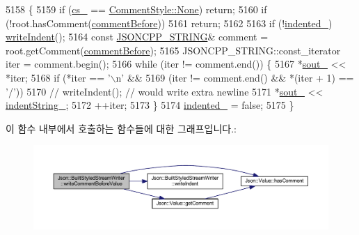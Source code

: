 \begin{DoxyCode}
5158                                                                        \{
5159   \textcolor{keywordflow}{if} (\hyperlink{struct_json_1_1_built_styled_stream_writer_a89a9c76c7531143b52785861ba21c1d4}{cs\_} == \hyperlink{struct_json_1_1_comment_style_a51fc08f3518fd81eba12f340d19a3d0cac8b32a8bae63414c8647d4919da8d437}{CommentStyle::None}) \textcolor{keywordflow}{return};
5160   \textcolor{keywordflow}{if} (!root.hasComment(\hyperlink{namespace_json_a4fc417c23905b2ae9e2c47d197a45351a52f1733775460517b2ea6bedf4906d52}{commentBefore}))
5161     \textcolor{keywordflow}{return};
5162 
5163   \textcolor{keywordflow}{if} (!\hyperlink{struct_json_1_1_built_styled_stream_writer_a6aa0ad023e623f600103631a6bca6d10}{indented\_}) \hyperlink{struct_json_1_1_built_styled_stream_writer_a2b38a3714d415c4bd3b4812897130f3d}{writeIndent}();
5164   \textcolor{keyword}{const} \hyperlink{json-forwards_8h_a1e723f95759de062585bc4a8fd3fa4be}{JSONCPP\_STRING}& comment = root.getComment(\hyperlink{namespace_json_a4fc417c23905b2ae9e2c47d197a45351a52f1733775460517b2ea6bedf4906d52}{commentBefore});
5165   JSONCPP\_STRING::const\_iterator iter = comment.begin();
5166   \textcolor{keywordflow}{while} (iter != comment.end()) \{
5167     *\hyperlink{class_json_1_1_stream_writer_a4f5603d4228a9fa46a42cb44e5234d9b}{sout\_} << *iter;
5168     \textcolor{keywordflow}{if} (*iter == \textcolor{charliteral}{'\(\backslash\)n'} &&
5169        (iter != comment.end() && *(iter + 1) == \textcolor{charliteral}{'/'}))
5170       \textcolor{comment}{// writeIndent();  // would write extra newline}
5171       *\hyperlink{class_json_1_1_stream_writer_a4f5603d4228a9fa46a42cb44e5234d9b}{sout\_} << \hyperlink{struct_json_1_1_built_styled_stream_writer_a0f8115a4fb474ab0e9de25f10e5ca09a}{indentString\_};
5172     ++iter;
5173   \}
5174   \hyperlink{struct_json_1_1_built_styled_stream_writer_a6aa0ad023e623f600103631a6bca6d10}{indented\_} = \textcolor{keyword}{false};
5175 \}
\end{DoxyCode}
이 함수 내부에서 호출하는 함수들에 대한 그래프입니다.\+:\nopagebreak
\begin{figure}[H]
\begin{center}
\leavevmode
\includegraphics[width=350pt]{struct_json_1_1_built_styled_stream_writer_a32c4afca4e08fba79bb0a80a8010283a_cgraph}
\end{center}
\end{figure}
